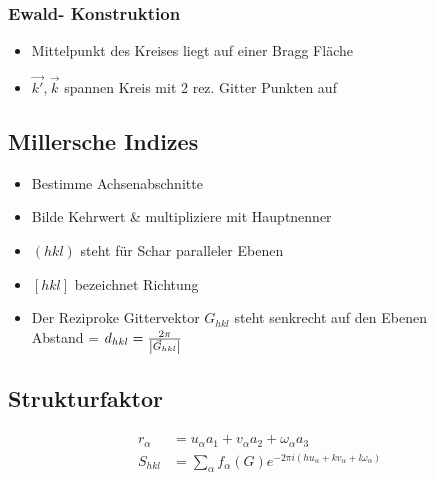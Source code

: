 \subsubsection*{Ewald- Konstruktion}
\begin{itemize}
    \itemsep 0pt
    \item Mittelpunkt des Kreises liegt auf einer Bragg Fläche
    \item $\vec{k'}, \vec{k}$ spannen Kreis mit 2 rez. Gitter Punkten auf 
\end{itemize}

\subsection*{Millersche Indizes}
\begin{itemize}
    \itemsep 0pt 
    \item Bestimme Achsenabschnitte 
    \item Bilde Kehrwert \& multipliziere mit Hauptnenner
    \item $(hkl)$ steht für Schar paralleler Ebenen
    \item $[hkl]$ bezeichnet Richtung
    \item Der Reziproke Gittervektor $G_{hkl}$ steht senkrecht auf den Ebenen \\
            Abstand = $d_{hkl} = \frac{2 \pi}{\left\vert\vec{G}_{hkl}\right\vert}$
\end{itemize}

\subsection*{Strukturfaktor}

\begin{equation*}
    \begin{aligned}
        r_{\alpha} &= u_\alpha a_1 + v_\alpha a_2 + \omega_\alpha a_3 \\ 
        S_{hkl} &= \sum_\alpha f_\alpha (G) e^{-2\pi i (hu_\alpha + kv_\alpha + l\omega_\alpha)}
    \end{aligned}
\end{equation*}
 

